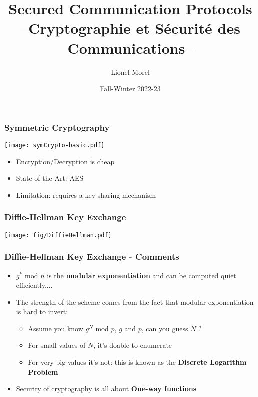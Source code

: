 \documentclass[
hyperref={pdfpagelabels=false}
,xcolor=table
]
{beamer}
\title[CSC - Protocols]{Secured Communication Protocols \\ --Cryptographie et Sécurité des Communications--}
\author[]{Lionel Morel}
\institute[]{Telecommunications - INSA Lyon}
\date{Fall-Winter 2022-23}
\begin{document}
\begin{frame}
  \maketitle
\end{frame}

\begin{frame}
  \frametitle{Symmetric Cryptography}

  \begin{center}
    \texttt{[image: symCrypto-basic.pdf]}
  \end{center}

  \begin{itemize}
  \item Encryption/Decryption is cheap
  \item State-of-the-Art: AES
  \item Limitation: requires a key-sharing mechanism
  \end{itemize}
  
\end{frame}


\begin{frame}
  \frametitle{Diffie-Hellman Key Exchange}
  \begin{center}
    \texttt{[image: fig/DiffieHellman.pdf]}
  \end{center}
\end{frame}

\begin{frame}
  \frametitle{Diffie-Hellman Key Exchange - Comments}
  
  \begin{itemize}
  \item $g^k \mbox{ mod } n$ is the \textbf{modular exponentiation} and can be
    computed quiet efficiently....
 

    
  \item The strength of the scheme comes from the fact that
    modular exponentiation is hard to invert:
    \begin{itemize}
    \item Assume you know $g^{N} \mbox{ mod } p$, $g$ and $p$, can you guess $N$ ? 
    \item For small values of $N$, it's doable to enumerate
    \item For very big values it's not: this is known as the
      \textbf{Discrete Logarithm Problem}
    \end{itemize}
  \item Security of cryptography is all about \textbf{One-way functions}
  \end{itemize}
\end{frame}
\end{document}
